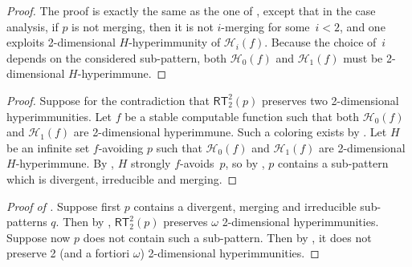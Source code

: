 \documentclass{article}
\def\Hc{\mathcal{H}}
\newcommand{\RT}[0]{\mathsf{RT}}
\def\N{\mathbb{N}}
\def\Hc{\mathcal{H}}
\newtheorem{theorem}{Theorem}
\numberwithin{theorem}{section}
\theoremstyle{definition}
\newtheorem{corollary}[theorem]{Corollary}
\begin{document}
\begin{proof}
The proof is exactly the same as the one of , except that in the case analysis, if $p$ is not merging, then it is not $i$-merging for some~$i < 2$, and one exploits 2-dimensional $H$-hyperimmunity of $\Hc_i(f)$. Because the choice of~$i$ depends on the considered sub-pattern, both $\Hc_0(f)$ and $\Hc_1(f)$ must be 2-dimensional $H$-hyperimmune.
\end{proof}

\begin{proof}
Suppose for the contradiction that $\RT_2^2(p)$ preserves two 2-dimensional hyperimmunities.
Let $f$ be a stable computable function such that both $\Hc_0(f)$ and  $\Hc_1(f)$ are 2-dimensional hyperimmune. Such a coloring exists by .
Let $H$ be an infinite set $f$-avoiding $p$ such that $\Hc_0(f)$ and $\Hc_1(f)$ are 2-dimensional $H$-hyperimmune. By , $H$ strongly $f$-avoids~$p$, so by , $p$ contains a sub-pattern which is divergent, irreducible and merging.   
\end{proof}

\begin{proof}[Proof of ]
Suppose first $p$ contains a divergent, merging and irredu\-cible sub-patterns $q$. Then by , $\RT_2^2(p)$ preserves $\omega$ 2-dimensional hyperimmunities.
Suppose now $p$ does not contain such a sub-pattern. Then by , it does not preserve 2 (and a fortiori $\omega$) 2-dimensional hyperim\-munities.
\end{proof}
\end{document}
